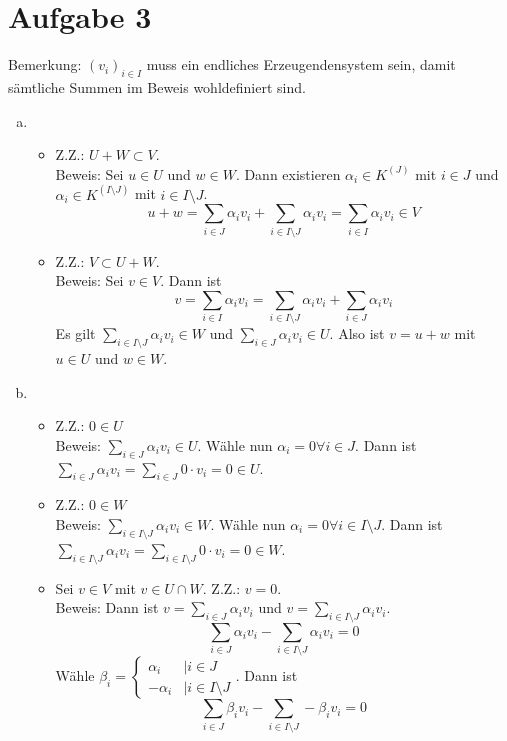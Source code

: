 \documentclass{article}
\begin{document}
	\section*{Aufgabe 3}
	Bemerkung: $(v_i)_{i\in I}$ muss ein endliches Erzeugendensystem sein, damit sämtliche Summen im Beweis wohldefiniert sind.
	\begin{enumerate}[(a)]
		\item 
		\begin{itemize}
			\item Z.Z.: $U + W \subset V$.\\
				Beweis: Sei $u\in U$ und $w\in W$. Dann existieren $\alpha_i\in K^{(J)}$ mit $i\in J$ und $\alpha_i\in K^{(I\setminus J)}$ mit $i\in I\setminus J$.
				\[u + w = \sum_{i\in J} \alpha_iv_i + \sum_{i\in I\setminus J} \alpha_iv_i = \sum_{i\in I}\alpha_iv_i \in V\]
			\item Z.Z.: $V \subset U+W$.\\
				Beweis: Sei $v\in V$. Dann ist \[v = \sum_{i\in I} \alpha_iv_i = \sum_{i\in I\setminus J} \alpha_iv_i + \sum_{i\in J} \alpha_iv_i\]
				Es gilt $\sum_{i\in I\setminus J} \alpha_iv_i \in W$ und $\sum_{i\in J} \alpha_iv_i \in U$. 
				Also ist $v = u+w$ mit $u\in U$ und $w\in W$.
		\end{itemize}
		\item 
		\begin{itemize}
			\item Z.Z.: $0\in U$\\
				Beweis: $\sum_{i\in J} \alpha_iv_i \in U$. Wähle nun $\alpha_i = 0\forall i\in J$. 
				Dann ist $\sum_{i\in J} \alpha_iv_i = \sum_{i\in J} 0\cdot v_i = 0\in U$.
			\item Z.Z.: $0\in W$\\
				Beweis: $\sum_{i\in I\setminus J} \alpha_iv_i \in W$. Wähle nun $\alpha_i = 0\forall i\in I\setminus J$. 
				Dann ist $\sum_{i\in I\setminus J} \alpha_iv_i = \sum_{i\in I\setminus J} 0\cdot v_i = 0\in W$.
			\item Sei $v \in V$ mit $v\in U\cap W$. Z.Z.: $v = 0$.\\
				Beweis: Dann ist $v = \sum_{i\in J} \alpha_iv_i$ und $v = \sum_{i\in I\setminus J} \alpha_iv_i$.
				\[\sum_{i\in J} \alpha_iv_i - \sum_{i\in I\setminus J} \alpha_iv_i = 0\]
				Wähle $\beta_i = \begin{cases} \alpha_i &|i\in J\\ -\alpha_i &| i\in I\setminus J\end{cases}$.
				Dann ist\[\sum_{i\in J} \beta_iv_i - \sum_{i\in I\setminus J} -\beta_iv_i = 0\]

\end{itemize}
\end{enumerate}
\end{document}
